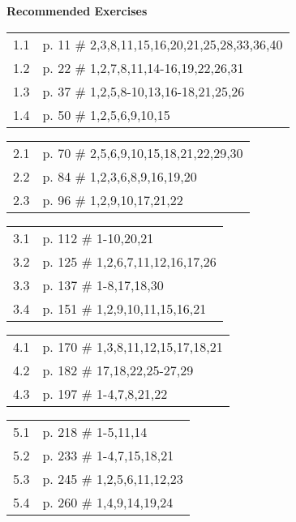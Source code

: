 \documentclass [11pt]{article}
\begin{document}

   {\bf  Recommended Exercises}\\

\begin{tabular}{ll}
 1.1 & p. 11 \# 2,3,8,11,15,16,20,21,25,28,33,36,40 \\
 1.2 & p. 22 \# 1,2,7,8,11,14-16,19,22,26,31 \\
 1.3 & p. 37 \# 1,2,5,8-10,13,16-18,21,25,26 \\
 1.4 & p. 50 \# 1,2,5,6,9,10,15 \\
\end{tabular}

\vskip 2mm

\begin{tabular}{ll}
 2.1 & p. 70 \# 2,5,6,9,10,15,18,21,22,29,30 \\
 2.2 & p. 84 \# 1,2,3,6,8,9,16,19,20 \\                       
 2.3 & p. 96 \# 1,2,9,10,17,21,22 \\ 
\end{tabular}

\vskip 2mm

\begin{tabular}{ll}
 3.1 & p. 112 \# 1-10,20,21 \\
 3.2 & p. 125 \# 1,2,6,7,11,12,16,17,26 \\
 3.3 & p. 137 \# 1-8,17,18,30 \\                     
 3.4 & p. 151 \# 1,2,9,10,11,15,16,21\\      
\end{tabular}

\vskip 2mm

\begin{tabular}{ll}
 4.1 & p. 170 \# 1,3,8,11,12,15,17,18,21 \\
 4.2 & p. 182 \# 17,18,22,25-27,29 \\
 4.3 & p. 197 \# 1-4,7,8,21,22 \\
\end{tabular}

\vskip 2mm

\begin{tabular}{ll}
 5.1 & p. 218 \# 1-5,11,14 \\
 5.2 & p. 233 \# 1-4,7,15,18,21 \\
 5.3 & p. 245 \# 1,2,5,6,11,12,23 \\
 5.4 & p. 260 \# 1,4,9,14,19,24 \\
\end{tabular}
\end{document}
